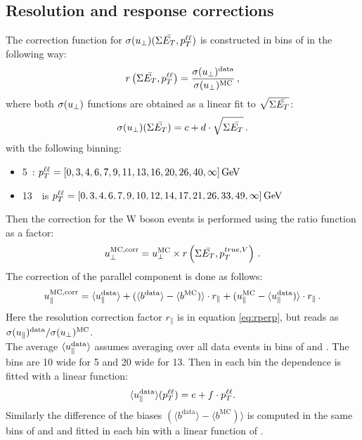      \subsection{Resolution and response corrections}
     The correction function for $\sigma(u_{\perp})(\Sigma \bar{E_T} ,p_{T}^{\ell\ell})$ is constructed in bins of \ptll in the following way:
     \begin{equation}
     \label{eq:rperp}
     r\left(\Sigma \bar{E_T} ,p_{T}^{\ell\ell}\right) = \frac{\sigma(u_{\perp})^\mathrm{data}
     }{\sigma(u_{\perp})^\mathrm{MC}}\,,
     \end{equation}
     where both $\sigma(u_{\perp})$ functions are obtained as a linear fit to $\sqrt{\Sigma \bar{E_T} }$:
     \begin{equation}
     \sigma(u_{\perp}) (\Sigma \bar{E_T} ) = c + d\cdot\sqrt{\Sigma \bar{E_T} }\,.
     \label{eqn:fitfunc_sigma}
     \end{equation}
     with the following \ptll binning:
     \begin{itemize}
     	\item 5~\TeV: $p_{T}^{\ell\ell} = [ 0, 3, 4, 6, 7, 9, 11, 13, 16, 20, 26, 40, \infty] \,\text{Ge\kern -0.1em V}$
     	\item 13~\TeV\ is $p_{T}^{\ell\ell} = [ 0, 3, 4, 6, 7, 9, 10, 12, 14, 17, 21, 26, 33, 49, \infty]\,\text{Ge\kern -0.1em V}$
     \end{itemize}
 	Then the correction for the W boson events is performed using the ratio function as a factor:
 	\begin{equation}
 	u_{\perp}^{\mathrm{MC,corr}} = u_{\perp}^{\mathrm{MC}} \times
 	r\left(\Sigma \bar{E_T} ,p_T^{true,V}\right)\,.
 	\end{equation}
 	The correction of the parallel component \upar is done as follows:
 	\begin{equation}
 	\upar^\mathrm{MC, corr} = \langle{\upar^\mathrm{data}}\rangle +
 	(\langle{b^\mathrm{data}}\rangle - \langle{b^\mathrm{MC}})\rangle\cdot r_{\parallel} + (\upar^\mathrm{MC} -
 	\langle{\upar^\mathrm{data}})\rangle\cdot r_{\parallel}\,.
 	\label{eq:uparcor}
 	\end{equation}
 	Here the resolution correction factor $r_{\parallel}$ is in equation \ref{eq:rperp}, but reads as $ \sigma(u_{\parallel})^\mathrm{data}/\sigma(u_{\perp})^\mathrm{MC}$. \\
 	The average $\langle{\upar^\mathrm{data}}\rangle$ assumes averaging over all data events in bins of \ptll and \setue. The \setue bins are 10\gev{} wide for 5\tev{} and 20\gev{} wide for 13\tev{}. Then in each \setue bin the \ptll dependence is fitted with a linear function: 
 	  \begin{equation}
 	\langle{\upar^\mathrm{data}}\rangle(\ptll) = e + f\cdot\ptll.
 	\label{eqn:fitfunc_upar}
 	\end{equation}  
 	Similarly the difference of the biases $(\langle{b^\mathrm{data}}\rangle - \langle{b^\mathrm{MC}})\rangle$ is computed in the same bins of \ptll and \setue and fitted in each \setue bin with a linear function of \ptll.
